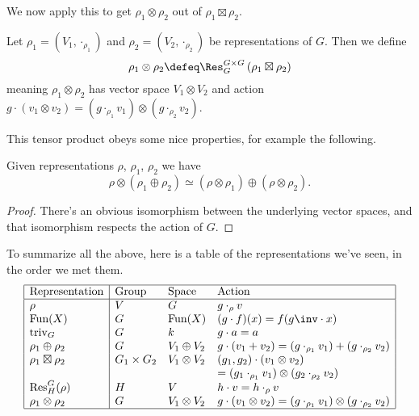 We now apply this to get $\rho_1 \otimes \rho_2$ out of $\rho_1 \boxtimes \rho_2$.
\begin{definition}
	Let $\rho_1 = (V_1, \cdot_{\rho_1})$
	and $\rho_2 = (V_2, \cdot_{\rho_2})$
	be representations of $G$.
	Then we define
	\[ \rho_1 \otimes \rho_2
		\defeq
		\Res^{G \times G}_G \left( \rho_1 \boxtimes \rho_2 \right)
	\]
	meaning $\rho_1 \otimes \rho_2$ has vector space $V_1 \otimes V_2$
	and action $g \cdot (v_1 \otimes v_2) = (g \cdot_{\rho_1} v_1) \otimes (g \cdot_{\rho_2} v_2)$.
\end{definition}
This tensor product obeys some nice properties, for example the following.
\begin{lemma}
	Given representations $\rho$, $\rho_1$, $\rho_2$ we have
	\[
		\rho \otimes \left( \rho_1 \oplus \rho_2 \right)
		\simeq
		\left( \rho \otimes \rho_1 \right) \oplus \left( \rho \otimes \rho_2 \right).
	\]
\end{lemma}
\begin{proof}
	There's an obvious isomorphism between the underlying vector spaces,
	and that isomorphism respects the action of $G$.
\end{proof}

To summarize all the above, here is a table of the representations we've seen, in the order we met them.
\[
	\begin{array}{|l|lll|}
		\hline
		\text{Representation} & \text{Group} & \text{Space} & \text{Action} \\ \hline
		\rho & V & G & g \cdot_\rho v \\
		\text{Fun}(X) & G & \text{Fun}(X) & (g \cdot f)(x) = f(g\inv \cdot x) \\
		\text{triv}_G & G & k & g \cdot a = a \\
		\rho_1 \oplus \rho_2 & G & V_1 \oplus V_2 & g \cdot (v_1 + v_2) = (g \cdot_{\rho_1} v_1) + (g \cdot_{\rho_2} v_2) \\
		\rho_1 \boxtimes \rho_2 & G_1 \times G_2 &  V_1 \otimes V_2 & (g_1, g_2) \cdot (v_1 \otimes v_2) \\
		&&& = (g_1 \cdot_{\rho_1} v_1) \otimes (g_2 \cdot_{\rho_2} v_2) \\
		\text{Res}^G_H(\rho) & H & V & h \cdot v = h \cdot_\rho v\\
		\rho_1 \otimes \rho_2 & G & V_1 \otimes V_2 & g \cdot (v_1 \otimes v_2) = (g \cdot_{\rho_1} v_1) \otimes (g \cdot_{\rho_2} v_2) \\
		\hline
	\end{array}
\]


